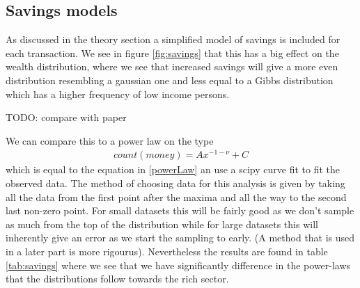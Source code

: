 \documentclass[a4paper,11pt]{article}
\begin{document}
{\subsection{Savings models}
As discussed in the theory section a simplified model of savings is included for each transaction. We see in figure \ref{fig:savings} that this has a big effect on the wealth distribution, where we see that increased savings will give a more even distribution resembling a gaussian one and less equal to a Gibbs distribution which has a higher frequency of low income persons. 

TODO: compare with paper


We can compare this to a power law on the type
\begin{align}
	count (money) = Ax^{-1-\nu} + C
\end{align}
which is equal to the equation in \ref{powerLaw} an use a scipy curve fit to fit the observed data. The method of choosing data for this analysis is given by taking all the data from the first point after the maxima and all the way to the second last non-zero point. For small datasets this will be fairly good as we don't sample as much from the top of the distribution while for large datasets this will inherently give an error as we start the sampling to early. (A method that is used in a later part is more rigourus). Nevertheless the results are found in table \ref{tab:savings} where we see that we have significantly difference in the power-laws that the distributions follow towards the rich sector. 


}
\end{document}
